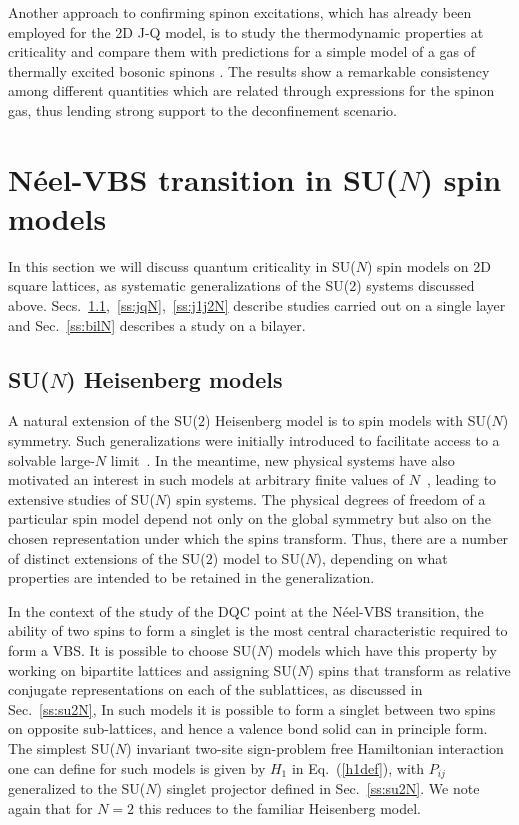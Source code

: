 \documentclass[range]{ar2e}
\begin{document}
Another approach to confirming spinon excitations, which has already been employed for the 2D J-Q model, is to study the thermodynamic properties at 
criticality and compare them with predictions for a simple model of a gas of thermally excited bosonic spinons \cite{Sandvik11a}. The results show a remarkable 
consistency among different quantities which are related through expressions for the spinon gas, thus lending strong support to the deconfinement scenario.

\section{N\'eel-VBS transition in SU($N$) spin models}
\label{sec:sunmodels}

In this section we will discuss quantum criticality in SU($N$) spin models on 2D square lattices, as systematic generalizations of the SU($2$) systems 
discussed above. Secs.~\ref{ss:j1N},~\ref{ss:jqN},~\ref{ss:j1j2N} describe studies carried out on a single layer and Sec.~\ref{ss:bilN} describes a study 
on a bilayer. 

\subsection{SU($N$) Heisenberg models}
\label{ss:j1N}
A natural extension of the SU($2$) Heisenberg model is to spin models with SU($N$) symmetry. Such generalizations were initially introduced to
facilitate access to a solvable large-$N$ limit~\cite{affleck1985:lgN,Read89}. In the meantime, new physical systems have also motivated an interest 
in such models at arbitrary finite values of $N$~\cite{gorshkov2010:sun,kugel1982:kk}, leading to extensive studies of SU($N$) spin systems. The 
physical degrees of freedom of a particular spin model depend not only on the global symmetry but also on the chosen representation under which the 
spins transform. Thus, there are a number of distinct extensions of the SU($2$) model to SU($N$), depending on what properties are intended to be retained 
in the generalization. 

In the context of the study of the DQC point at the N\'eel-VBS transition, the ability of two spins to form a singlet is the most
central characteristic required to form a VBS. It is possible to choose SU($N$) models which have this property by working on bipartite lattices and
assigning SU($N$) spins that transform as relative conjugate representations on each of the sublattices, as discussed in Sec.~\ref{ss:su2N}, In such 
models it is possible to form a singlet between two spins on opposite sub-lattices, and hence a valence bond solid can in principle form.  The simplest 
SU($N$) invariant two-site sign-problem free Hamiltonian interaction one can define for such models is given by $H_1$ in Eq.~(\ref{h1def}), with $P_{ij}$ 
generalized to the SU($N$) singlet projector defined in Sec.~\ref{ss:su2N}. We note again that for $N=2$ this reduces to the familiar Heisenberg model. 
\end{document}
